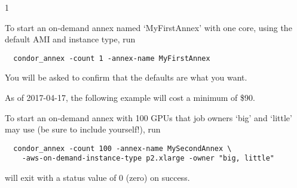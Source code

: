 \begin{ManPage}{\label{man-condor-annex}}{1}
\Examples

To start an on-demand annex named `MyFirstAnnex' with one core,
using the default AMI and instance type, run

\begin{verbatim}
  condor_annex -count 1 -annex-name MyFirstAnnex
\end{verbatim}

You will be asked to confirm that the defaults are what you want.

As of 2017-04-17, the following example will cost a minimum of \$90.

To start an on-demand annex with 100 GPUs that job owners `big' and `little'
may use (be sure to include yourself!), run

\begin{verbatim}
  condor_annex -count 100 -annex-name MySecondAnnex \
    -aws-on-demand-instance-type p2.xlarge -owner "big, little"
\end{verbatim}

\ExitStatus

 will exit with a status value of 0 (zero) on success.

\end{ManPage}
